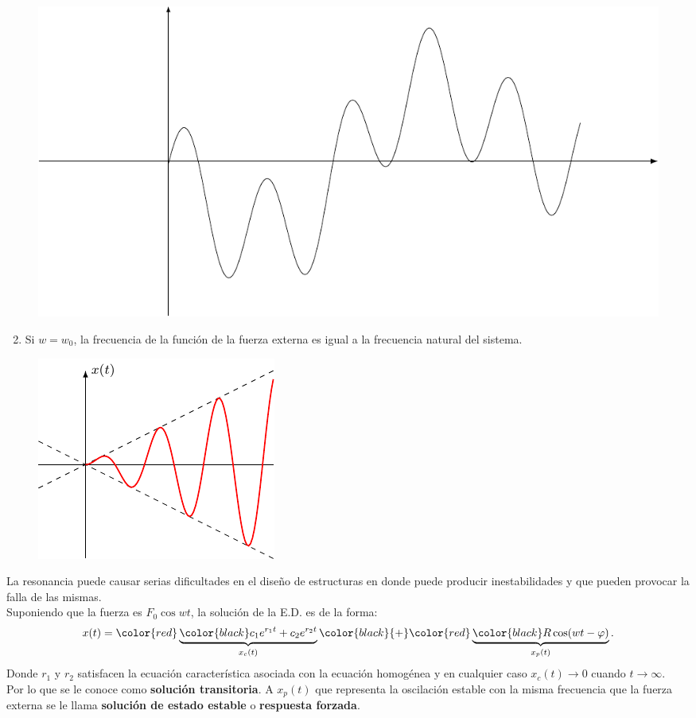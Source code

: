 \documentclass{beamer}
\begin{document}
\begin{frame}[t]
	\begin{block}{}
		\color{red}{Pulsasiones:} \vspace{-5mm}
		\begin{figure}[hbtp!]
			\centering
			\includegraphics[width= 0.5 \linewidth]{IMAGENES/7/tikz.pdf}
		\end{figure}
		\begin{enumerate}
			\setcounter{enumi}{1}
			\item Si \(w=w_0\), la frecuencia de la función de la fuerza externa es igual a la frecuencia natural del sistema.
		\end{enumerate}
		\begin{figure}[hbtp!]
			\centering
			\includegraphics[width= 0.4 \linewidth]{IMAGENES/8/tikz.pdf}
		\end{figure}
	\end{block}
\end{frame}

\begin{frame}[t]
	\begin{block}{}
		La resonancia puede causar serias dificultades en el diseño de estructuras en donde puede producir inestabilidades y que pueden provocar la falla de las mismas. \\[2mm]
		Suponiendo que la fuerza es \(F_0 \cos wt\), la solución de la E.D. es de la forma:
		\[
			x(t) = \color{red} \underbrace{\color{black} c_1e^{r_1t} + c_2e^{r_2 t}} _{x_c(t)} \color{black}{+} \color{red} \underbrace{\color{black} R \cos (wt- \varphi)} _{x_p(t)}.
		\]
		Donde \(r_1\) y \(r_2\) satisfacen la ecuación característica asociada con la ecuación homogénea y en cualquier caso \(x_c(t) \longrightarrow 0\) cuando \(t \longrightarrow \infty\). \\[2mm]
		Por lo que se le conoce como \textbf{solución transitoria}. A \(x_p(t )\) que representa la oscilación estable con la misma frecuencia que la fuerza externa se le llama \textbf{solución de estado estable} o \textbf{respuesta forzada}. 
	\end{block}
\end{frame}
\end{document}
